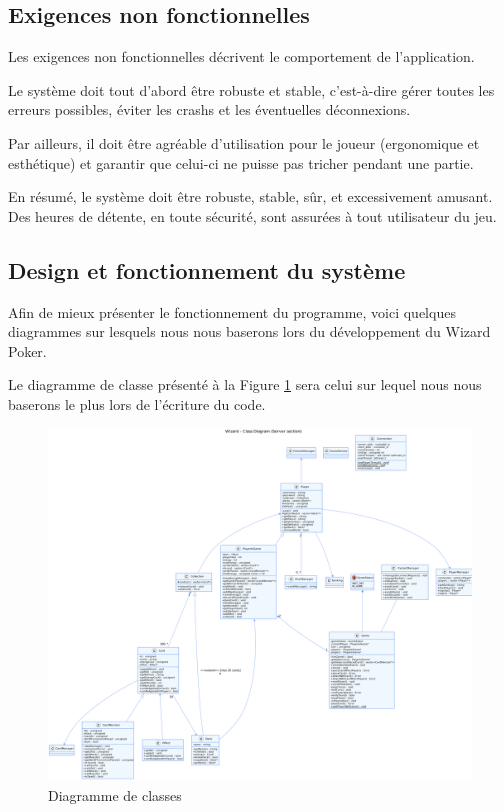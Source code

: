 \documentclass[11pt,a4paper]{article}
\begin{document}
\subsection{Exigences non fonctionnelles}
\label{sec:exi-nonfonc-sys}

Les exigences non fonctionnelles décrivent le comportement de
l'application.

\medbreak

Le système doit tout d'abord être robuste et stable, c'est-à-dire
gérer toutes les erreurs possibles, éviter les crashs et les éventuelles
déconnexions.

\medbreak

Par ailleurs, il doit être agréable d'utilisation pour le joueur
(ergonomique et esthétique) et garantir que celui-ci ne puisse
pas tricher pendant une partie.

\medbreak

En résumé, le système doit être robuste, stable, sûr, et excessivement amusant. Des
heures de détente, en toute sécurité, sont assurées à tout utilisateur du jeu.

\subsection{Design et fonctionnement du système}
\label{sec:design}

Afin de mieux présenter le fonctionnement du programme, voici quelques
diagrammes sur lesquels nous nous baserons lors du
développement du Wizard Poker.

\medbreak

Le diagramme de classe présenté à la Figure \ref{fig:class} sera celui sur lequel nous nous baserons le plus lors de l'écriture du code.

\begin{figure}
  \centering
  \includegraphics[width=1\textwidth]{assets/uml/ClassDiagram3.png}
  \caption{\label{fig:class} Diagramme de classes}
\end{figure}
\end{document}
